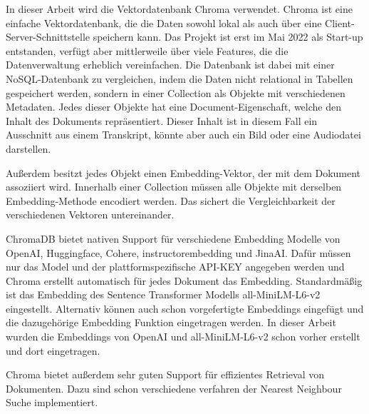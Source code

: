 





In dieser Arbeit wird die Vektordatenbank Chroma verwendet. 
Chroma ist eine einfache Vektordatenbank, die die Daten sowohl lokal als auch über eine Client-Server-Schnittstelle speichern kann.
Das Projekt ist erst im Mai 2022 als Start-up entstanden, verfügt aber mittlerweile über viele Features, die die Datenverwaltung erheblich vereinfachen.
Die Datenbank ist dabei mit einer NoSQL-Datenbank zu vergleichen, indem die Daten nicht relational in Tabellen gespeichert werden, sondern in einer Collection als Objekte mit verschiedenen Metadaten.
Jedes dieser Objekte hat eine Document-Eigenschaft, welche den Inhalt des Dokuments repräsentiert.
Dieser Inhalt ist in diesem Fall ein Ausschnitt aus einem Transkript, könnte aber auch ein Bild oder eine Audiodatei darstellen.

Außerdem besitzt jedes Objekt einen Embedding-Vektor, der mit dem Dokument assoziiert wird. 
Innerhalb einer Collection müssen alle Objekte mit derselben Embedding-Methode encodiert werden.
Das sichert die Vergleichbarkeit der verschiedenen Vektoren untereinander.

ChromaDB bietet nativen Support für verschiedene Embedding Modelle von OpenAI, Huggingface, Cohere, instructorembedding und JinaAI.
Dafür müssen nur das Model und der plattformspezifische API-KEY angegeben werden und Chroma erstellt automatisch für jedes Dokument das Embedding.
Standardmäßig ist das Embedding des Sentence Transformer Modells all-MiniLM-L6-v2 eingestellt.
Alternativ können auch schon vorgefertigte Embeddings eingefügt und die dazugehörige Embedding Funktion eingetragen werden.
In dieser Arbeit wurden die Embeddings von OpenAI und all-MiniLM-L6-v2 schon vorher erstellt und dort eingetragen.

Chroma bietet außerdem sehr guten Support für effizientes Retrieval von Dokumenten.
Dazu sind schon verschiedene verfahren der Nearest Neighbour Suche implementiert.
 

